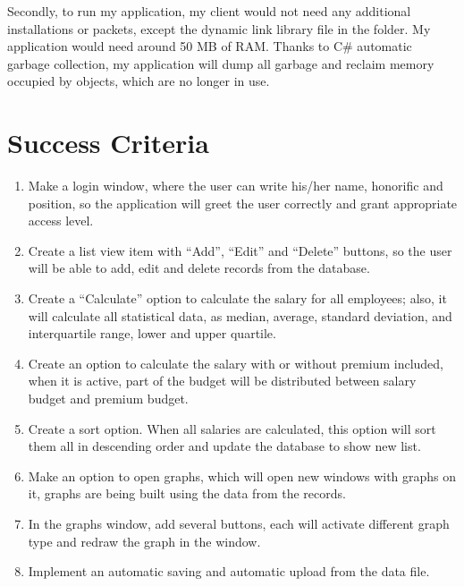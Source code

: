 \documentclass{article}
\begin{document}
Secondly, to run my application, my client would not need any additional installations or packets, except the dynamic link library file in the folder. My application would need around 50 MB of RAM. Thanks to C\# automatic garbage collection, my application will dump all garbage and reclaim memory occupied by objects, which are no longer in use.\\

\section*{Success Criteria}

\begin{enumerate}

\item Make a login window, where the user can write his/her name, honorific and position, so the application will greet the user correctly and grant appropriate access level.

\item Create a list view item with “Add”, “Edit” and “Delete” buttons, so the user will be able to add, edit and delete records from the database.

\item Create a “Calculate” option to calculate the salary for all employees; also, it will calculate all statistical data, as median, average, standard deviation, and interquartile range, lower and upper quartile.

\item Create an option to calculate the salary with or without premium included, when it is active, part of the budget will be distributed between salary budget and premium budget.

\item Create a sort option. When all salaries are calculated, this option will sort them all in descending order and update the database to show new list.

\item Make an option to open graphs, which will open new windows with graphs on it, graphs are being built using the data from the records.

\item In the graphs window, add several buttons, each will activate different graph type and redraw the graph in the window.

\item Implement an automatic saving and automatic upload from the data file.


\end{enumerate}
\end{document}
